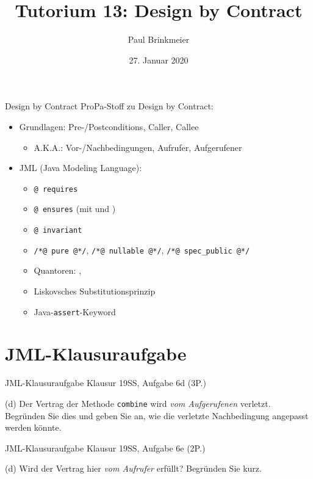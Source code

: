 \documentclass{beamer}
\title{Tutorium 13: Design by Contract}
\author{Paul Brinkmeier}
\institute{Tutorium Programmierparadigmen am KIT}
\date{27. Januar 2020}
\newcommand{\code}[1]{
	\begin{mdframed}
		
	\end{mdframed}
}
\begin{document}
\begin{frame}
	\titlepage
\end{frame}

\begin{frame}{Design by Contract}
	ProPa-Stoff zu Design by Contract:

	\begin{itemize}
		\item Grundlagen: Pre-/Postconditions, Caller, Callee
		\begin{itemize}
			\item A.K.A.: Vor-/Nachbedingungen, Aufrufer, Aufgerufener
		\end{itemize}
		\item JML (Java Modeling Language):
		\begin{itemize}
			\item \texttt{@ requires}
			\item \texttt{@ ensures} (mit \texttt{\string\old} und \texttt{\string\result})
			\item \texttt{@ invariant}
			\item \texttt{/*@ pure @*/}, \texttt{/*@ nullable @*/}, \texttt{/*@ spec_public @*/}
			\item Quantoren: \texttt{\string\forall}, \texttt{\string\exists}
			\item Liskovsches Substitutionsprinzip
			\pause
			\item Java-\texttt{assert}-Keyword
		\end{itemize}
	\end{itemize}
\end{frame}

\section{JML-Klausuraufgabe}

\begin{frame}{JML-Klausuraufgabe}
    Klausur 19SS, Aufgabe 6d (3P.)

    {
    \footnotesize
    \code{code/19ss-a6d.java}

    (d) Der Vertrag der Methode \texttt{combine} wird \emph{vom Aufgerufenen} verletzt.
    Begründen Sie dies und geben Sie an, wie die verletzte Nachbedingung angepasst werden könnte.
    }
\end{frame}

\begin{frame}{JML-Klausuraufgabe}
    Klausur 19SS, Aufgabe 6e (2P.)

    {
    \footnotesize
    \code{code/19ss-a6e.java}

    (d) Wird der Vertrag hier \emph{vom Aufrufer} erfüllt?
    Begründen Sie kurz.
    }
\end{frame}
\end{document}

